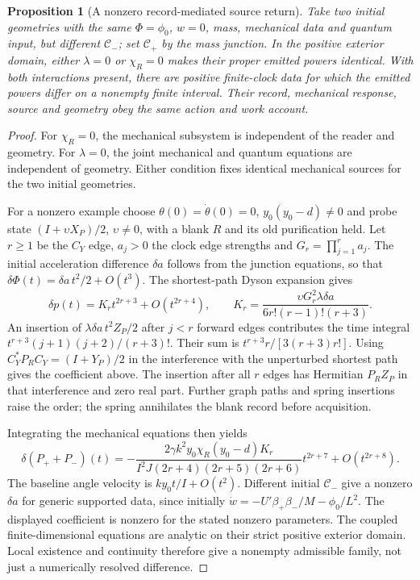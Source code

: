 \documentclass[12pt,a4paper]{article}
\newtheorem{proposition}[theorem]{Proposition}
\begin{document}
\begin{proposition}[A nonzero record-mediated source return]
\label{prop:record-mediated-source}
Take two initial geometries with the same $\Phi=\phi_0$, $w=0$, mass,
mechanical data and quantum input, but different $\mathcal C_-$;
set $\mathcal C_+$ by the mass junction. In the positive exterior domain,
either $\lambda=0$ or $\chi_R=0$ makes their proper emitted powers
identical. With both interactions present, there are positive finite-clock
data for which the emitted powers differ on a nonempty finite interval.
Their record, mechanical response, source and geometry obey the same action
and work account.
\end{proposition}
\begin{proof}
For $\chi_R=0$, the mechanical subsystem is independent of the reader
and geometry. For $\lambda=0$, the joint mechanical and quantum equations
are independent of geometry. Either condition fixes identical mechanical
sources for the two initial geometries.

For a nonzero example choose $\theta(0)=\dot\theta(0)=0$,
$y_0(y_0-d)\ne0$ and probe state $(I+\upsilon X_P)/2$, $\upsilon\ne0$,
with a blank $R$ and its old purification held. Let $r\ge1$ be the
$C_Y$ edge, $a_j>0$ the clock edge strengths and
$G_r=\prod_{j=1}^r a_j$. The initial acceleration difference
$\delta a$ follows from the junction equations, so that
$\delta\Phi(t)=\delta a\,t^2/2+O(t^3)$.
The shortest-path Dyson expansion gives
\begin{equation}\label{eq:record-spring-leading-record}
 \delta p(t)=K_r t^{2r+3}+O(t^{2r+4}),\qquad
 K_r=\frac{\upsilon G_r^2\lambda\delta a}
             {6r!(r-1)!(r+3)}.
\end{equation}
An insertion of $\lambda\delta a\,t^2Z_P/2$ after $j<r$ forward
edges contributes the time integral
$t^{r+3}(j+1)(j+2)/(r+3)!$.
Their sum is $t^{r+3}r/[3(r+3)r!]$.
Using $C_Y^*P_RC_Y=(I+Y_P)/2$ in the interference with the unperturbed
shortest path gives the coefficient above. The insertion after all
$r$ edges has Hermitian $P_RZ_P$ in that interference and zero real
part. Further graph paths and spring insertions raise the order;
the spring annihilates the blank record before acquisition.

Integrating the mechanical equations then yields
\begin{equation}\label{eq:record-spring-leading-source}
 \delta(P_++P_-)(t)=
 -\frac{2\gamma k^2 y_0\chi_R(y_0-d)K_r}
 {I^2J(2r+4)(2r+5)(2r+6)}t^{2r+7}+O(t^{2r+8}).
\end{equation}
The baseline angle velocity is $ky_0t/I+O(t^2)$.
Different initial $\mathcal C_-$ give a nonzero $\delta a$ for generic
supported data, since initially
$\dot w=-U'\beta_+\beta_-/M-\phi_0/L^2$.
The displayed coefficient is nonzero for the stated nonzero parameters.
The coupled finite-dimensional equations are analytic on their strict
positive exterior domain. Local existence and continuity therefore give
a nonempty admissible family, not just a numerically resolved difference.
\end{proof}
\end{document}
